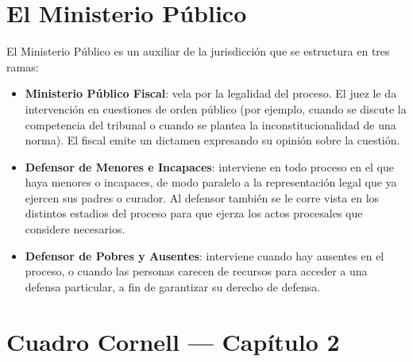 \documentclass[12pt,oneside]{book}
\begin{document}
\section{El Ministerio Público}

El Ministerio Público es un auxiliar de la jurisdicción que se estructura en tres ramas:

\begin{itemize}
    \item \textbf{Ministerio Público Fiscal}: vela por la legalidad del proceso. El juez le da intervención en cuestiones de orden público (por ejemplo, cuando se discute la competencia del tribunal o cuando se plantea la inconstitucionalidad de una norma). El fiscal emite un dictamen expresando su opinión sobre la cuestión.
    \item \textbf{Defensor de Menores e Incapaces}: interviene en todo proceso en el que haya menores o incapaces, de modo paralelo a la representación legal que ya ejercen sus padres o curador. Al defensor también se le corre vista en los distintos estadios del proceso para que ejerza los actos procesales que considere necesarios.
    \item \textbf{Defensor de Pobres y Ausentes}: interviene cuando hay ausentes en el proceso, o cuando las personas carecen de recursos para acceder a una defensa particular, a fin de garantizar su derecho de defensa.
\end{itemize}

\section*{Cuadro Cornell --- Capítulo 2}
\end{document}
